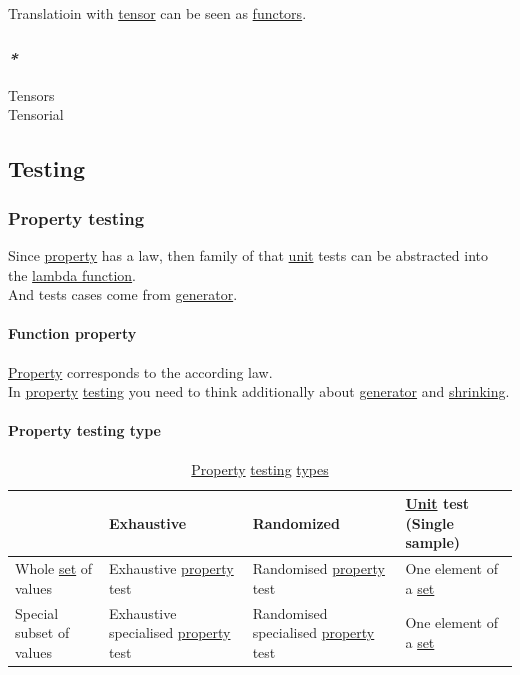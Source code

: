 \documentclass[11pt]{article}
\begin{document}
Translatioin with \hyperref[org7fc4e6f]{tensor} can be seen as \hyperref[orgdd21ed6]{functors}.\\

\subsubsection{\emph{*}}
\label{sec:orgb13ea04}

\label{orgafb2e6d}Tensors\\
\label{org68b7304}Tensorial\\

\subsection{\label{org8d1ff3f}Testing}
\label{sec:orgc5f5c5d}
\subsubsection{\label{org67b0fd1}Property testing}
\label{sec:org23d6d8a}
Since \hyperref[orgf8c3cc7]{property} has a law, then family of that \hyperref[org0b3ee46]{unit} tests can be abstracted into the \hyperref[orgaf59855]{lambda function}.\\
And tests cases come from \hyperref[org1fe413f]{generator}.\\

\paragraph{\label{orgfc3dff9}Function property}
\label{sec:org0aea582}
\hyperref[orgf8c3cc7]{Property} corresponds to the according law.\\
In \hyperref[orgf8c3cc7]{property} \hyperref[org8d1ff3f]{testing} you need to think additionally about \hyperref[org1fe413f]{generator} and \hyperref[org75e4286]{shrinking}.\\

\paragraph{\label{orgfb0703a}Property testing type}
\label{sec:org26c4ea4}

\begin{table}[htbp]
\caption{\label{tab:property-testing-type}\hyperref[orgf8c3cc7]{Property} \hyperref[org8d1ff3f]{testing} \hyperref[org4209edd]{types}}
\centering
\begin{tabular}{llll}
\hline
 & Exhaustive & Randomized & \hyperref[org0b3ee46]{Unit} test (Single sample)\\
\hline
Whole \hyperref[org1faf06d]{set} of values & Exhaustive \hyperref[orgf8c3cc7]{property} test & Randomised \hyperref[orgf8c3cc7]{property} test & One element of a \hyperref[org1faf06d]{set}\\
Special subset of values & Exhaustive specialised \hyperref[orgf8c3cc7]{property} test & Randomised specialised \hyperref[orgf8c3cc7]{property} test & One element of a \hyperref[org1faf06d]{set}\\
\hline
\end{tabular}
\end{table}
\end{document}
